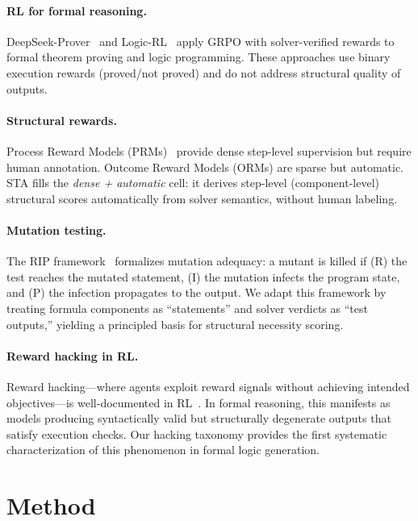 \documentclass[11pt,a4paper]{article}
\begin{document}
\paragraph{RL for formal reasoning.}
DeepSeek-Prover~\cite{xie2025logic} and Logic-RL~\cite{wu2025agentic} apply GRPO with solver-verified rewards to formal theorem proving and logic programming.
These approaches use binary execution rewards (proved/not proved) and do not address structural quality of outputs.

\paragraph{Structural rewards.}
Process Reward Models (PRMs)~\cite{lightman2024lets} provide dense step-level supervision but require human annotation.
Outcome Reward Models (ORMs) are sparse but automatic.
STA fills the \emph{dense + automatic} cell: it derives step-level (component-level) structural scores automatically from solver semantics, without human labeling.

\paragraph{Mutation testing.}
The RIP framework~\cite{jia2011mutation} formalizes mutation adequacy: a mutant is killed if (R) the test reaches the mutated statement, (I) the mutation infects the program state, and (P) the infection propagates to the output.
We adapt this framework by treating formula components as ``statements'' and solver verdicts as ``test outputs,'' yielding a principled basis for structural necessity scoring.

\paragraph{Reward hacking in RL.}
Reward hacking---where agents exploit reward signals without achieving intended objectives---is well-documented in RL~\cite{skalse2022defining}.
In formal reasoning, this manifests as models producing syntactically valid but structurally degenerate outputs that satisfy execution checks.
Our hacking taxonomy provides the first systematic characterization of this phenomenon in formal logic generation.

\section{Method}
\end{document}
